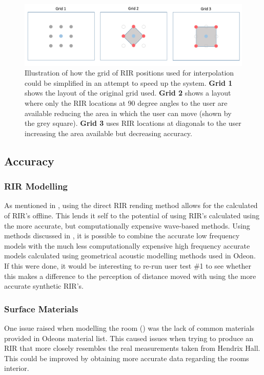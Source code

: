 \documentclass[../../main.tex]{subfiles}
\begin{document}
			\begin{figure}[H]
				\centerline{\includegraphics[scale = 0.45]{Sections/FurtherWork/images/grids2.png}}
				\caption{Illustration of how the grid of \ac{RIR} positions used for interpolation could be simplified in an attempt to speed up the system. \textbf{Grid 1} shows the layout of the original grid used. \textbf{Grid 2} shows a layout where only the \ac{RIR} locations at 90 degree angles to the user are available reducing the area in which the user can move (shown by the grey square). \textbf{Grid 3} uses \ac{RIR} locations at diagonals to the user increasing the area available but decreasing accuracy.}
				\label{grids}
			\end{figure}

	\subsection{Accuracy}
		\subsubsection{RIR Modelling}
			As mentioned in , using the direct \ac{RIR} rending method allows for the calculated of \ac{RIR}'s offline. This lends it self to the potential of using \ac{RIR}'s calculated using the more accurate, but computationally expensive wave-based methods. Using methods discussed in \cite{Southern}, it is possible to combine the accurate low frequency models with the much less computationally expensive high frequency accurate models calculated using geometrical acoustic modelling methods used in Odeon. If this were done, it would be interesting to re-run user test \#1 to see whether this makes a difference to the perception of distance moved with using the more accurate synthetic \ac{RIR}'s.

		\subsubsection{Surface Materials}
			One issue raised when modelling the room () was the lack of common materials provided in Odeons material list. This caused issues when trying to produce an \ac{RIR} that more closely resembles the real measurements taken from Hendrix Hall. This could be improved by obtaining more accurate data regarding the rooms interior.
\end{document}
